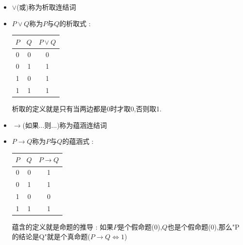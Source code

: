 \documentclass[UTF8,12pt]{ctexbook}
\begin{document}
{{{{{\begin{itemize}
{            合取的定义就是只有当两边都是1的时候才取1.

            注意左边两列,可以当成二进制读出"0","1","2","3",此表称为真值表.

            构造真值表的方法就是将所有命题列出,每个命题一列,当有$n$个命题时就会有$2^n$行,从左往右第一个命题二分,一半是0一半是1,第二列在第一列的基础上再次二分$\dots$,如此就能写出所有取值.
            }
      \item $\lor$(或)称为析取连结词
      \item {
            $P \lor Q$称为$P$与$Q$的析取式 :

            \begin{center}
              \begin{tabular}{c|c|c}
                \hline
                $P$ & $Q$ & $P \lor Q$ \\
                \hline
                0   & 0   & 0          \\
                0   & 1   & 1          \\
                1   & 0   & 1          \\
                1   & 1   & 1          \\
                \hline
              \end{tabular}
            \end{center}

            析取的定义就是只有当两边都是0时才取0,否则取1.
            }
      \item $\to$(如果$\dots$则$\dots$)称为蕴涵连结词
      \item {
            $P \to Q$称为$P$与$Q$的蕴涵式 :

            \begin{center}
              \begin{tabular}{c|c|c}
                \hline
                $P$ & $Q$ & $P \to Q$ \\
                \hline
                0   & 0   & 1         \\
                0   & 1   & 1         \\
                1   & 0   & 0         \\
                1   & 1   & 1         \\
              \end{tabular}
            \end{center}

            蕴含的定义就是命题的推导 : 如果$P$是个假命题(0),$Q$也是个假命题(0),那么"P的结论是Q"就是个真命题($P \to Q \Leftrightarrow 1$)

}
\end{itemize}}}}}}
\end{document}

